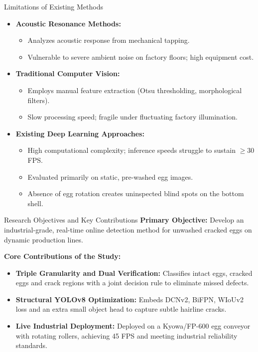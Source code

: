 \documentclass{beamer}
\begin{document}
\begin{frame}{Limitations of Existing Methods}
\small
\begin{itemize}
    \item \textbf{Acoustic Resonance Methods:}
    \begin{itemize}
        \item Analyzes acoustic response from mechanical tapping.
        \item Vulnerable to severe ambient noise on factory floors; high equipment cost.
    \end{itemize}
    \medskip
    \item \textbf{Traditional Computer Vision:}
    \begin{itemize}
        \item Employs manual feature extraction (Otsu thresholding, morphological filters).
        \item Slow processing speed; fragile under fluctuating factory illumination.
    \end{itemize}
    \medskip
    \item \textbf{Existing Deep Learning Approaches:}
    \begin{itemize}
        \item High computational complexity; inference speeds struggle to sustain $\ge 30$ FPS.
        \item Evaluated primarily on static, pre-washed egg images.
        \item Absence of egg rotation creates uninspected blind spots on the bottom shell.
    \end{itemize}
\end{itemize}
\end{frame}

\begin{frame}{Research Objectives and Key Contributions}
\small
\textbf{Primary Objective:} Develop an industrial-grade, real-time online detection method for unwashed cracked eggs on dynamic production lines.

\bigskip
\textbf{Core Contributions of the Study:}
\begin{itemize}
    \item \textbf{Triple Granularity and Dual Verification:} Classifies intact eggs, cracked eggs and crack regions with a joint decision rule to eliminate missed defects.
    \medskip
    \item \textbf{Structural YOLOv8 Optimization:} Embeds DCNv2, BiFPN, WIoUv2 loss and an extra small object head to capture subtle hairline cracks.
    \medskip
    \item \textbf{Live Industrial Deployment:} Deployed on a Kyowa/FP-600 egg conveyor with rotating rollers, achieving 45 FPS and meeting industrial reliability standards.
\end{itemize}
\end{frame}
\end{document}
